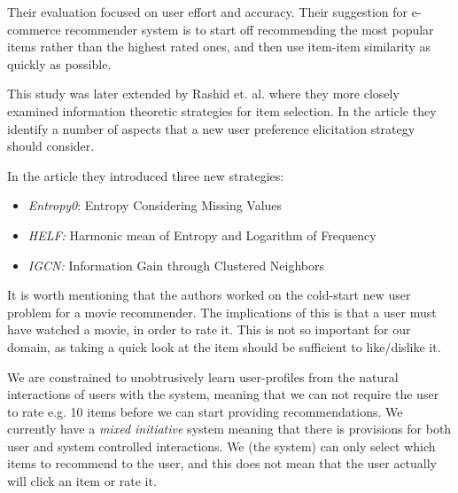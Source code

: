 Their evaluation focused on user effort and accuracy. Their suggestion for e-commerce recommender system is to start off recommending the most popular items rather than the highest rated ones, and then use item-item similarity as quickly as possible.

This study was later extended by Rashid et. al. \cite{Rashid2008} where they more closely examined information theoretic strategies for item selection. In the article they identify a number of aspects that a new user preference elicitation strategy should consider.

In the article they introduced three new strategies:

\begin{itemize}
\item \emph{Entropy0}: Entropy Considering Missing Values
\item \emph{HELF:} Harmonic mean of Entropy and Logarithm of Frequency
\item \emph{IGCN:} Information Gain through Clustered Neighbors
\end{itemize}



It is worth mentioning that the authors worked on the cold-start new user problem for a movie recommender. The implications of this is that a user must have watched a movie, in order to rate it. This is not so important for our domain, as taking a quick look at the item should be sufficient to like/dislike it.

We are constrained to unobtrusively learn user-profiles from the natural interactions of users with the system, meaning that we can not require the user to rate e.g. 10 items before we can start providing recommendations. We currently have a \emph{mixed initiative} system meaning that there is provisions for both user and system controlled interactions. We (the system) can only select which items to recommend to the user, and this does not mean that the user actually will click an item or rate it.

